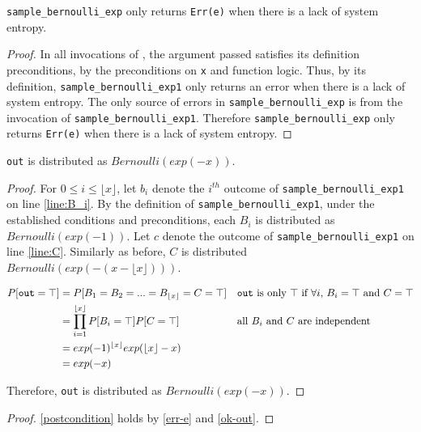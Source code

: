 \documentclass{article}
\begin{document}
\begin{lemma}
    \label{err-e}
    \texttt{sample\_bernoulli\_exp} only returns \texttt{Err(e)} when there is a lack of system entropy.
\end{lemma}

\begin{proof}
    In all invocations of , the argument passed satisfies its definition preconditions,
    by the preconditions on \texttt{x} and function logic.
    Thus, by its definition, \texttt{sample\_bernoulli\_exp1} only returns an error when there is a lack of system entropy.
    The only source of errors in \texttt{sample\_bernoulli\_exp} is from the invocation of \texttt{sample\_bernoulli\_exp1}.
    Therefore \texttt{sample\_bernoulli\_exp} only returns \texttt{Err(e)} when there is a lack of system entropy.
\end{proof}

\begin{lemma}
    \label{ok-out}
    \texttt{out} is distributed as $Bernoulli(exp(-x))$.
\end{lemma}

\begin{proof}
    For $0 \le i \le \lfloor x \rfloor$, let $b_i$ denote the $i^{th}$ outcome of \texttt{sample\_bernoulli\_exp1} on line \ref{line:B_i}.
    By the definition of \texttt{sample\_bernoulli\_exp1}, under the established conditions and preconditions,
    each $B_i$ is distributed as $Bernoulli(exp(-1))$.
    Let $c$ denote the outcome of \texttt{sample\_bernoulli\_exp1} on line \ref{line:C}.
    Similarly as before, $C$ is distributed $Bernoulli(exp(-(x - \lfloor x \rfloor)))$.

    \begin{align*}
        P[\texttt{out} = \top] &= P[B_1 = B_2 = ... = B_{\lfloor x \rfloor} = C = \top] && \text{\texttt{out} is only $\top$ if $\forall i$, $B_i = \top$ and $C = \top$} \\
        &= \prod_{i=1}^{\lfloor x \rfloor} P[B_i = \top] P[C = \top] && \text{all $B_i$ and $C$ are independent} \\
        &= exp(-1)^{\lfloor x \rfloor} exp(\lfloor x \rfloor - x) \\
        &= exp(-x)
    \end{align*}

    Therefore, \texttt{out} is distributed as $Bernoulli(exp(-x))$.
\end{proof}


\begin{proof}
    \ref{postcondition} holds by \ref{err-e} and \ref{ok-out}.
\end{proof}



\end{document}
